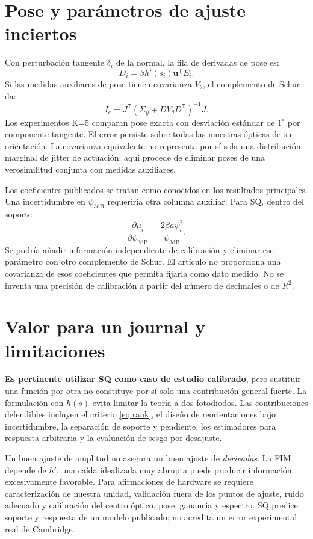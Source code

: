 \documentclass[11pt,a4paper]{article}
\begin{document}
\section{Pose y parámetros de ajuste inciertos}
Con perturbación tangente $\delta_i$ de la normal, la fila de derivadas de pose es:
\begin{equation}
 D_i=\beta h'(s_i)\mathbf u^{\mathsf T}E_i.
\end{equation}
Si las medidas auxiliares de pose tienen covarianza $V_\theta$, el complemento de Schur da:
\begin{equation}
 I_e=J^{\mathsf T}(\Sigma_y+DV_\theta D^{\mathsf T})^{-1}J.
\end{equation}
Los experimentos K=5 comparan pose exacta con desviación estándar de $1^\circ$ por componente tangente. El error persiste sobre todas las muestras ópticas de su orientación. La covarianza equivalente no representa por sí sola una distribución marginal de jitter de actuación: aquí procede de eliminar poses de una verosimilitud conjunta con medidas auxiliares.

Los coeficientes publicados se tratan como conocidos en los resultados principales. Una incertidumbre en $\psi_{3\mathrm{dB}}$ requeriría otra columna auxiliar. Para SQ, dentro del soporte:
\begin{equation}
 \frac{\partial\mu_i}{\partial\psi_{3\mathrm{dB}}}
 =\frac{2\beta a\psi_i^2}{\psi_{3\mathrm{dB}}}.
\end{equation}
Se podría añadir información independiente de calibración y eliminar ese parámetro con otro complemento de Schur. El artículo no proporciona una covarianza de esos coeficientes que permita fijarla como dato medido. No se inventa una precisión de calibración a partir del número de decimales o de $R^2$.

\section{Valor para un journal y limitaciones}
\textbf{Es pertinente utilizar SQ como caso de estudio calibrado}, pero sustituir una función por otra no constituye por sí solo una contribución general fuerte. La formulación con $h(s)$ evita limitar la teoría a dos fotodiodos. Las contribuciones defendibles incluyen el criterio \eqref{eq:rank}, el diseño de reorientaciones bajo incertidumbre, la separación de soporte y pendiente, los estimadores para respuesta arbitraria y la evaluación de sesgo por desajuste.

Un buen ajuste de amplitud no asegura un buen ajuste de \emph{derivadas}. La FIM depende de $h'$; una caída idealizada muy abrupta puede producir información excesivamente favorable. Para afirmaciones de hardware se requiere caracterización de nuestra unidad, validación fuera de los puntos de ajuste, ruido adecuado y calibración del centro óptico, pose, ganancia y espectro. SQ predice soporte y respuesta de un modelo publicado; no acredita un error experimental real de Cambridge.
\end{document}
